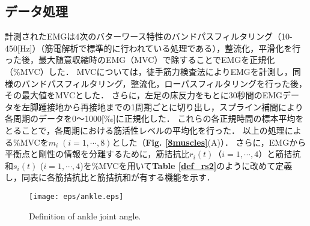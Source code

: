 \subsection{データ処理}
%
\begin{table}[!t]
 \caption{Definition of the A-A ratio and the A-A sum for biological system.}
 \begin{center}
 \end{center}
\end{table}
%
計測されたEMGは4次のバターワース特性のバンドパスフィルタリング（10-450[Hz]）（筋電解析で標準的に行われている処理である\cite{Crams2008}），整流化，平滑化を行った後，最大随意収縮時のEMG（MVC）で除することでEMGを正規化（\%MVC）した．
MVCについては，徒手筋力検査法によりEMGを計測し\cite{Hislop2008}，同様のバンドパスフィルタリング，整流化，ローパスフィルタリングを行った後，その最大値をMVCとした．
さらに，左足の床反力をもとに30秒間のEMGデータを左脚踵接地から再接地までの1周期ごとに切り出し，スプライン補間により各周期のデータを0～1000[‰]に正規化した．
これらの各正規時間の標本平均をとることで，各周期における筋活性レベルの平均化を行った．
以上の処理による\%MVCを$m_i\;(i=1,\cdots,8)$とした（{\bf Fig. \ref{8muscles}}(A)）．
さらに，EMGから平衡点と剛性の情報を分離するために，筋拮抗比$r_{i}(t)$（$i=1,\cdots,4$）と筋拮抗和$s_{i}(t)$ ($i=1,\cdots,4$)を\%MVCを用いて{\bf Table \ref{def_rs2}}のように改めて定義し，同表に各筋拮抗比と筋拮抗和が有する機能を示す．
%
\begin{figure}[!t]
 \begin{center}
  \texttt{[image: eps/ankle.eps]}
  \caption{Definition of ankle joint angle.}
  \label{ankle}
 \end{center}
\end{figure}
%
